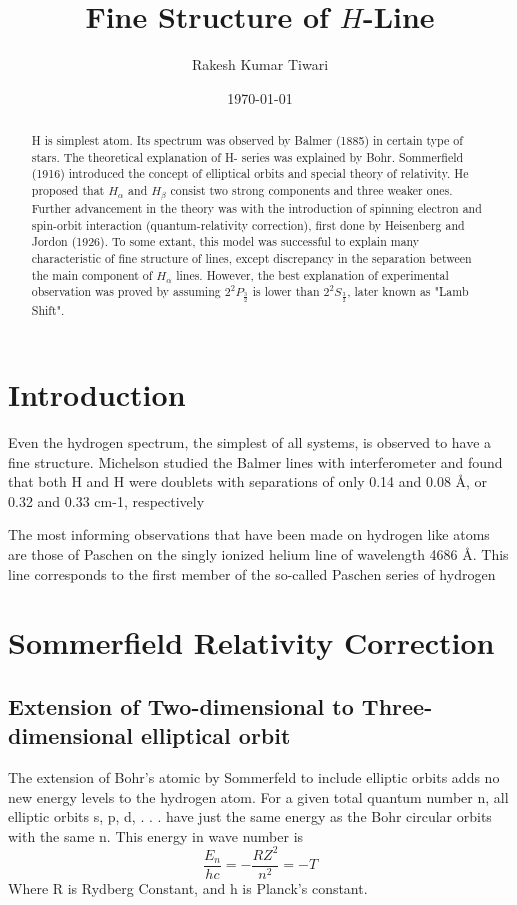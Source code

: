 \documentclass[a4paper]{article}
\title{Fine Structure of $H$-Line}
\author{Rakesh Kumar Tiwari}
\date{\today}
\begin{document}
\maketitle

\begin{abstract}
H is simplest atom. Its spectrum was observed by Balmer (1885) in certain type of stars. The theoretical explanation of H- series was explained by Bohr. Sommerfield (1916) introduced the concept of elliptical orbits and special theory of relativity. He proposed that $H_{\alpha}$ and  $H_{\beta}$ consist two strong components and three weaker ones. Further advancement in the theory was with the introduction of spinning electron and spin-orbit interaction (quantum-relativity correction), first done by Heisenberg and Jordon (1926). To some extant, this model was successful to explain many characteristic of fine structure of lines, except discrepancy in the separation between the main component of $H_{\alpha}$ lines. However, the best explanation of experimental observation was proved by assuming $2^{2}P_{\frac{3}{2}}$ is lower than $2^{2}S_{\frac{3}{2}}$, later known as "Lamb Shift". 
\end{abstract}

\section{Introduction}
\label{sec:introduction}

                   
Even the hydrogen spectrum, the simplest of all systems, is observed to have a fine structure. Michelson studied the Balmer lines with interferometer and found that both H and H were doublets with separations of only 0.14 and 0.08 Å, or 0.32 and 0.33 cm-1, respectively
                   
The most informing observations that have been made on hydrogen like atoms are those of Paschen  on the singly ionized helium line  of wavelength 4686 Å. This line  corresponds to the first member of the so-called Paschen series of hydrogen

\section{Sommerfield Relativity Correction}
\label{sec:theory}

\subsection{Extension of Two-dimensional to Three-dimensional elliptical orbit }
The extension of Bohr's atomic by Sommerfeld to include elliptic orbits adds no new energy levels to the hydrogen atom. For a given total quantum number n, all elliptic orbits s, p, d, . . . have just the same energy as the Bohr circular orbits with the same n. This energy in wave number is 
\begin{equation}
    \frac{E_n}{hc}=-\frac{RZ^2}{n^2}=-T
\end{equation}
Where R is Rydberg Constant, and h is Planck's constant.
\end{document}

